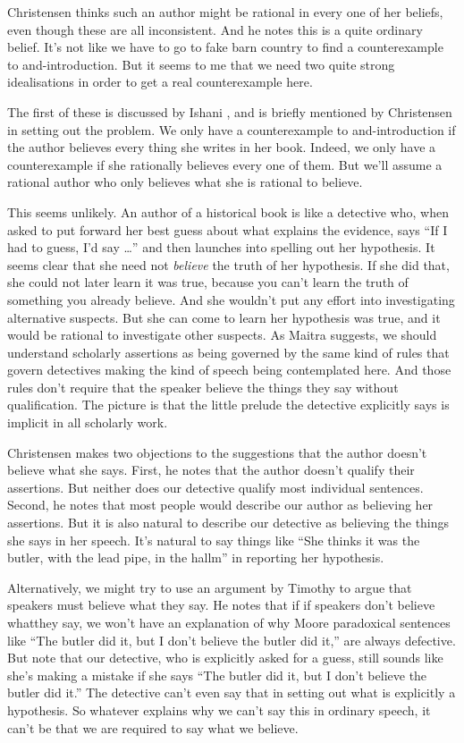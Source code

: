 \documentclass[11pt,]{book}
\begin{document}
Christensen thinks such an author might be rational in every one of her beliefs, even though these are all inconsistent. And he notes this is a quite ordinary belief. It's not like we have to go to fake barn country to find a
counterexample to and-introduction. But it seems to me that we need two quite strong idealisations in order to get a real counterexample here.

The first of these is discussed by Ishani \citet{Maitra2010}, and is briefly mentioned by Christensen in setting out the problem. We only have a counterexample to and-introduction if the author believes every thing she writes in her book. Indeed, we only have a counterexample if she rationally believes every one of them. But we'll assume a rational author who only believes what she is rational to believe.

This seems unlikely. An author of a historical book is like a detective who, when asked to put forward her best guess about what explains the evidence, says ``If I had to guess, I'd say \ldots{}'' and then launches into spelling out her hypothesis. It seems clear that she need not \emph{believe} the truth of her hypothesis. If she did that, she could not later learn it was true, because you can't learn the truth of something you already believe. And she wouldn't put any effort into investigating alternative suspects. But she can come to learn her hypothesis was true, and it would be rational to investigate other suspects. As Maitra suggests, we should understand scholarly assertions as being governed by the same kind of rules that govern detectives making the kind of speech being contemplated here. And those rules don't require that the speaker believe the things they say without qualification. The picture is that the little prelude the detective explicitly says is implicit in all scholarly work.

Christensen makes two objections to the suggestions that the author doesn't believe what she says. First, he notes that the author doesn't qualify their assertions. But neither does our detective qualify most individual sentences. Second, he notes that most people would describe our author as believing her assertions. But it is also natural to describe our detective as believing the things she says in her speech. It's natural to say things like ``She thinks it was the butler, with the lead pipe, in the hallm'' in reporting her hypothesis.

Alternatively, we might try to use an argument by Timothy \citet{Williamson2000} to argue that speakers must believe what they say. He notes that if if speakers don't believe whatthey say, we won't have an explanation of why Moore paradoxical sentences like ``The butler did it, but I don't believe the butler did it,'' are always defective. But note that our detective, who is explicitly asked for a guess, still sounds like she's making a mistake if she says ``The butler did it, but I don't believe the butler did it.'' The detective can't even say that in setting out what is explicitly a hypothesis. So whatever explains why we can't say this in ordinary speech, it can't be that we are required to say what we believe.
\end{document}

